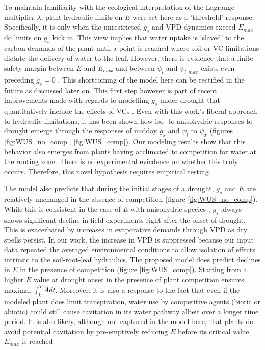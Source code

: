 \documentclass[utf8]{frontiersSCNS} %
\begin{document}
 To maintain familiarity with the ecological interpretation of the Lagrange multiplier $\lambda$, plant hydraulic limits on $E$ were set here as a 'threshold' response. Specifically, it is only when the unrestricted $g_s$ and VPD dynamics exceed $E_{max}$ do limits on $g_s$ kick in. This view implies that water uptake is 'slaved' to the carbon demands of the plant until a point is reached where soil or VC limitations dictate the delivery of water to the leaf.  However, there is evidence that a finite safety margin between $E$ and $E_{max}$ and between $\psi_l$ and $\psi_{l, max}$ exists even preceding $g_s = 0$ \citep{mcdowell_mechanisms_2008, plaut_hydraulic_2012}. This shortcoming of the model here can be rectified in the future as discussed later on. This first step however is part of recent improvements made with regards to modelling $g_s$ under drought that quantitatively include the effects of VCs \citep{sperry_what_2015, sperry_predicting_2017}. Even with this work's liberal approach to hydraulic limitations, it has been shown how iso- to anisohydric responses to drought emerge through the responses of midday $g_s$ and $\psi_l$ to $\psi_x$ (figures \ref{fig:WUS_no_comp}, \ref{fig:WUS_comp}). Our modeling results show that this behavior also emerges from plants having acclimated to competition for water at the rooting zone. There is no experimental evicdence on whether this truly occurs. Therefore, this novel hypothesis requires empirical testing.

The model also predicts that during the initial stages of a drought, $g_s$ and $E$ are relatively unchanged in the absence of competition (figure \ref{fig:WUS_no_comp}). While this is consistent in the case of $E$ with anisohydric species \citep{hochberg_iso/anisohydry:_2018}, $g_s$ always shows significant decline in field experiments right after the onset of drought. This is exacerbated by increases in evaporative demands through VPD as dry spells persist. In our work, the increase in VPD is suppressed because our input data repeated the averaged environmental conditions to allow isolation of effects intrinsic to the soil-root-leaf hydraulics. The proposed model does predict declines in $E$ in the presence of competition (figure \ref{fig:WUS_comp}). Starting from a higher $E$ value at drought onset in the presence of plant competition ensures maximal $\int_0^T A dt$. Moreover, it is also a response to the fact that even if the modeled plant does limit transpiration, water use by competitive agents (biotic or abiotic) could still cause cavitation in its water pathway albeit over a longer time period. It is also likely, although not captured in the model here, that plants do avoid potential cavitation by pre-emptively reducing $E$ before its critical value $E_{max}$ is reached. 
\end{document}

